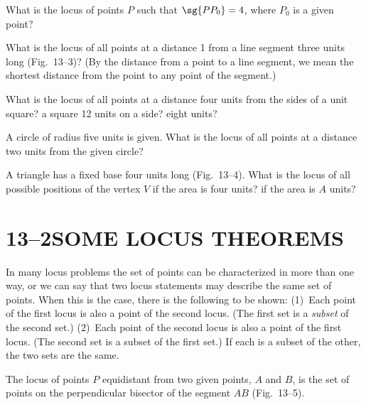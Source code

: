 \documentclass[11pt]{book}
\theoremstyle{bkplain}
\theoremstyle{XIplainnote}
\theoremstyle{bkplain}
\theoremstyle{bkplain}
\begin{document}
\begin{exercisecols}
\begin{exlist}
\item What is the locus of points $P$ such that $\sg{PP_0} = 4$, where $P_0$ is
      a given point?
\item What is the locus of all points at a distance 1 from a line segment three
      units long (Fig.~13--3)? (By the distance from a point to a line segment,
      we mean the shortest distance from the point to any point of the
      segment.)
\exfig{\FIGXIIITHREE}
\item What is the locus of all points at a distance four units from the sides of
      a unit square? a square 12 units on a side? eight units?
\item A circle of radius five units is given. What is the locus of all points at
      a distance two units from the given circle?
\item A triangle has a fixed base four units long (Fig.~13--4). What is the
      locus of all possible positions of the vertex $V$ if the area is four
      units? if the area is $A$ units?
\exfig{\FIGXIIIFOUR}
\end{exlist}
\end{exercisecols}

\section*{13--2\quad SOME LOCUS THEOREMS}

In many locus problems the set of points can be characterized in more than one
way, or we can say that two locus statements may describe the same set of
points. When this is the case, there is the following to be shown: (1)~Each
point of the first locus is also a point of the second locus. (The first set is
a \emph{subset} of the second set.) (2)~Each point of the second locus is also a
point of the first locus. (The second set is a subset of the first set.) If each
is a subset of the other, the two sets are the same.

\FIGXIIIFIVE

\begin{theorem}
The locus of points $P$ equidistant from two given points, $A$ and $B$, is the
set of points on the perpendicular bisector of the segment $AB$ (Fig.~13--5).
\end{theorem}
\end{document}

